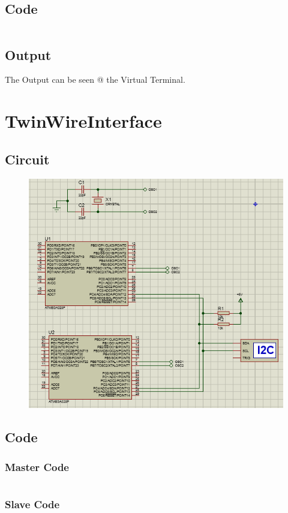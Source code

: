 \documentclass[oneside]{book}
\begin{document}
\subsection{Code}
\inputminted[bgcolor=black]{c}{../programFiles/USART0.c}
\subsection{Output}
\quad The Output can be seen @ the Virtual Terminal.


\section{TwinWireInterface}
\subsection{Circuit}
\begin{figure}[H]
    \centering
    \includegraphics[height=0.2\textheight]{TWI.png}
\end{figure}
\subsection{Code}
\subsubsection{Master Code}
\inputminted[bgcolor=black]{c}{../programFiles/I2C_masterMode.c}
\subsubsection{Slave Code}
\inputminted[bgcolor=black]{c}{../programFiles/I2C_slaveMode.c}
\end{document}
